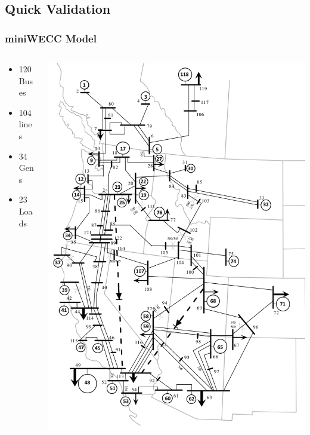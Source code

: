 \documentclass[14pt, unknownkeysallowed]{beamer}
\begin{document}
\subsection{Quick Validation}
\begin{frame}
\frametitle{miniWECC Model}
\begin{columns}
	\begin{column}{0.45\textwidth}
		\begin{itemize}
			\item 120 Buses
			\item 104 lines
			\item 34 Gens
			\item 23 Loads
		\end{itemize}
	\end{column}
	\begin{column}{.5\textwidth}
		\includegraphics[height=.8\textheight]{miniWECCpres} %
	\end{column}
\end{columns}
\end{frame}
\end{document}
